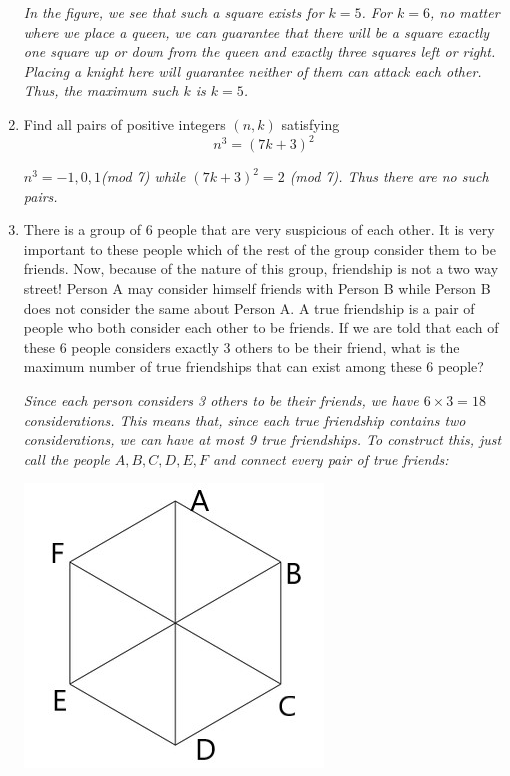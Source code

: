 \documentclass{article}
\begin{document}
\begin{enumerate}[1.]
{\itshape In the figure, we see that such a square exists for $k=5$. For $k=6$, no matter where we place a queen, we can guarantee that there will be a square exactly one square up or down from the queen and exactly three squares left or right. Placing a knight here will guarantee neither of them can attack each other. Thus, the maximum such $k$ is $k=5$.}


\item %
Find all pairs of positive integers $(n,k)$ satisfying $$n^3=(7k+3)^2$$

{\itshape $n^3 = -1,0,1$(mod 7) while $(7k+3)^2 = 2$ (mod 7). Thus there are no such pairs.}


\item %
There is a group of 6 people that are very suspicious of each other. It is very important to these people which of the rest of the group consider them to be friends. Now, because of the nature of this group, friendship is not a two way street! Person A may consider himself friends with Person B while Person B does not consider the same about Person A. A true friendship is a pair of people who both consider each other to be friends. If we are told that each of these 6 people considers exactly 3 others to be their friend, what is the maximum number of true friendships that can exist among these 6 people?

{\itshape Since each person considers 3 others to be their friends, we have $6\times 3 = 18$ considerations. This means that, since each true friendship contains two considerations, we can have at most 9 true friendships. To construct this, just call the people $A,B,C,D,E,F$ and connect every pair of true friends: }
\begin{center}
\includegraphics[scale=0.7]{graph.jpg}
\end{center}



\end{enumerate}
\end{document}
